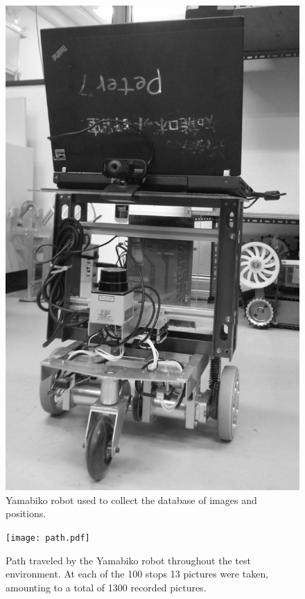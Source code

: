 \documentclass[twocolumn, 9pt]{jsproceedings}
\begin{document}
\begin{figure}[h!]
\includegraphics[width=\columnwidth]{yamabiko.png}
\caption{Yamabiko robot used to collect the database of images and positions.}
\label{fig:yamabiko}
\end{figure}

\begin{figure}[h!]
\texttt{[image: path.pdf]}
\caption{Path traveled by the Yamabiko robot throughout the test environment. At each of the 100 stops 13 pictures were taken, amounting to a total of 1300 recorded pictures.}
\label{fig:path}
\end{figure}
\end{document}
